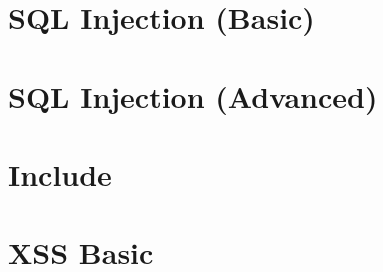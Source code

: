 




\section{SQL Injection (Basic)}



\clearpage

\section{SQL Injection (Advanced)}


\clearpage

\section{Include}


\clearpage


\section{XSS Basic}


\clearpage


